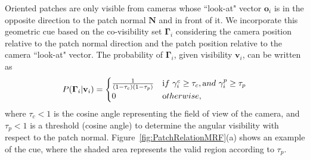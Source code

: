 Oriented patches are only visible from cameras whose ``look-at" vector $\mathbf{o}_i$ is in the opposite direction to the patch normal $\mathbf{N}$ and in front of it. We incorporate this geometric cue based on the co-visibility set $\mathbf{\Gamma}_i$ considering the camera position relative to the patch normal direction and the patch position relative to the camera ``look-at" vector. The probability of $\mathbf{\Gamma}_i$, given visibility $\mathbf{v}_i$, can be written as 
\begin{eqnarray}
P(\mathbf{\Gamma}_i | \mathbf{v}_i ) = \begin{cases} \frac{1}{ (1- \tau_c)(1- \tau_p)} & {\textrm if~} \gamma_i^c \geq \tau_c,{\textrm and~} \gamma_i^p \geq  \tau_p  \\
0 & {\textrm otherwise,}\end{cases} 
\label{eq:eq_normal}
\end{eqnarray}
where $\tau_c<1 $ is the cosine angle representing the field of view of the camera, and $\tau_p<1$ is a threshold (cosine angle) to determine the angular visibility with respect to the patch normal. Figure~\ref{fig:PatchRelationMRF}(a) shows an example of the cue, where the shaded area represents the valid region according to $\tau_p$.


